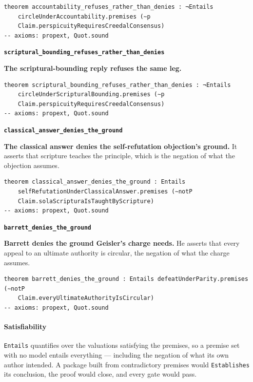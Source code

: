 \documentclass[11pt]{article}
\begin{document}
{\small\begin{verbatim}
theorem accountability_refuses_rather_than_denies : ¬Entails
    circleUnderAccountability.premises (∼p
    Claim.perspicuityRequiresCreedalConsensus)
-- axioms: propext, Quot.sound
\end{verbatim}}
\par\medskip\noindent\textbf{\texttt{scriptural\_\allowbreak{}bounding\_\allowbreak{}refuses\_\allowbreak{}rather\_\allowbreak{}than\_\allowbreak{}denies}}\par\nobreak\noindent
\textbf{The scriptural-bounding reply refuses the same leg.}

{\small\begin{verbatim}
theorem scriptural_bounding_refuses_rather_than_denies : ¬Entails
    circleUnderScripturalBounding.premises (∼p
    Claim.perspicuityRequiresCreedalConsensus)
-- axioms: propext, Quot.sound
\end{verbatim}}
\par\medskip\noindent\textbf{\texttt{classical\_\allowbreak{}answer\_\allowbreak{}denies\_\allowbreak{}the\_\allowbreak{}ground}}\par\nobreak\noindent
\textbf{The classical answer denies the self-refutation objection’s ground.} It asserts that scripture teaches the principle, which is the negation of what the objection assumes.

{\small\begin{verbatim}
theorem classical_answer_denies_the_ground : Entails
    selfRefutationUnderClassicalAnswer.premises (∼notP
    Claim.solaScripturaIsTaughtByScripture)
-- axioms: propext, Quot.sound
\end{verbatim}}
\par\medskip\noindent\textbf{\texttt{barrett\_\allowbreak{}denies\_\allowbreak{}the\_\allowbreak{}ground}}\par\nobreak\noindent
\textbf{Barrett denies the ground Geisler’s charge needs.} He asserts that every appeal to an ultimate authority is circular, the negation of what the charge assumes.

{\small\begin{verbatim}
theorem barrett_denies_the_ground : Entails defeatUnderParity.premises (∼notP
    Claim.everyUltimateAuthorityIsCircular)
-- axioms: propext, Quot.sound
\end{verbatim}}
\paragraph*{Satisfiability}
\leavevmode\par\nobreak
\texttt{Entails} quantifies over the valuations satisfying the premises, so a premise set with no model entails everything — including the negation of what its own author intended. A package built from contradictory premises would \texttt{Establishes} its conclusion, the proof would close, and every gate would pass.
\end{document}
